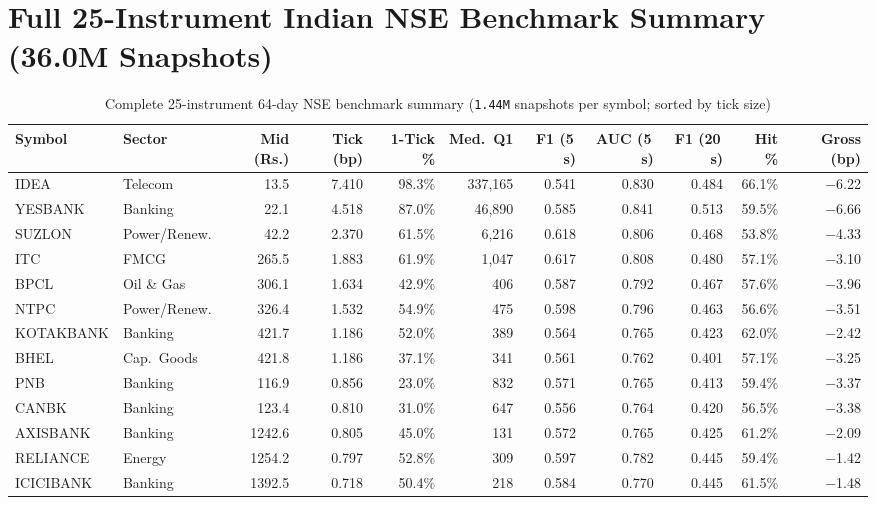 \documentclass[12pt,a4paper,oneside]{report}
\newcommand{\code}[1]{\texttt{#1}}
\begin{document}
\section{Full 25-Instrument Indian NSE Benchmark Summary (36.0M Snapshots)}\label{app:nse25}

\begin{table}[H]
\centering\scriptsize
\setlength{\tabcolsep}{2.1pt}
\caption{Complete 25-instrument 64-day NSE benchmark summary (\code{1.44M} snapshots per symbol; sorted by tick size)}
\label{tab:nse_25_full}
\begin{tabular}{@{}llrrrrrrrrr@{}}
\toprule
\textbf{Symbol} & \textbf{Sector} & \textbf{Mid (Rs.)} & \textbf{Tick (bp)} & \textbf{1-Tick \%} & \textbf{Med.\ Q1} & \textbf{F1 (5\,s)} & \textbf{AUC (5\,s)} & \textbf{F1 (20\,s)} & \textbf{Hit \%} & \textbf{Gross (bp)} \\
\midrule
IDEA & Telecom & 13.5 & 7.410 & 98.3\% & 337{,}165 & 0.541 & 0.830 & 0.484 & 66.1\% & $-$6.22 \\
YESBANK & Banking & 22.1 & 4.518 & 87.0\% & 46{,}890 & 0.585 & 0.841 & 0.513 & 59.5\% & $-$6.66 \\
SUZLON & Power/Renew. & 42.2 & 2.370 & 61.5\% & 6{,}216 & 0.618 & 0.806 & 0.468 & 53.8\% & $-$4.33 \\
ITC & FMCG & 265.5 & 1.883 & 61.9\% & 1{,}047 & 0.617 & 0.808 & 0.480 & 57.1\% & $-$3.10 \\
BPCL & Oil \& Gas & 306.1 & 1.634 & 42.9\% & 406 & 0.587 & 0.792 & 0.467 & 57.6\% & $-$3.96 \\
NTPC & Power/Renew. & 326.4 & 1.532 & 54.9\% & 475 & 0.598 & 0.796 & 0.463 & 56.6\% & $-$3.51 \\
KOTAKBANK & Banking & 421.7 & 1.186 & 52.0\% & 389 & 0.564 & 0.765 & 0.423 & 62.0\% & $-$2.42 \\
BHEL & Cap.\ Goods & 421.8 & 1.186 & 37.1\% & 341 & 0.561 & 0.762 & 0.401 & 57.1\% & $-$3.25 \\
PNB & Banking & 116.9 & 0.856 & 23.0\% & 832 & 0.571 & 0.765 & 0.413 & 59.4\% & $-$3.37 \\
CANBK & Banking & 123.4 & 0.810 & 31.0\% & 647 & 0.556 & 0.764 & 0.420 & 56.5\% & $-$3.38 \\
AXISBANK & Banking & 1242.6 & 0.805 & 45.0\% & 131 & 0.572 & 0.765 & 0.425 & 61.2\% & $-$2.09 \\
RELIANCE & Energy & 1254.2 & 0.797 & 52.8\% & 309 & 0.597 & 0.782 & 0.445 & 59.4\% & $-$1.42 \\
ICICIBANK & Banking & 1392.5 & 0.718 & 50.4\% & 218 & 0.584 & 0.770 & 0.445 & 61.5\% & $-$1.48 \\

\end{tabular}
\end{table}
\end{document}
